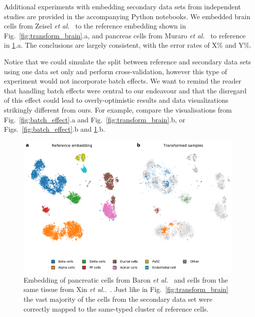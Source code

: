 \documentclass[runningheads]{llncs}
\newcommand{\etal}{\textit{et al.}}
\begin{document}
Additional experiments with embedding secondary data sets from independent
studies are provided in the accompanying Python notebooks. We embedded brain
cells from Zeisel \etal~\cite{zeisel2015} to the reference embedding shown in
Fig.~\ref{fig:transform_brain}.a, and pancreas cells from Muraro \etal~\cite{muraro2016} to reference
in \ref{fig:transform_pancreas}.a. The conclusions are largely consistent, with the error rates 
of X\% and Y\%. 

Notice that we could simulate the split between reference and secondary data
sets using one data set only and perform cross-validation, however this type of experiment
would not incorporate batch effects. We want to remind the reader that handling
batch effects were central to our endeavour and that the disregard of this effect
could lead to overly-optimistic results and data visualizations strikingly different from ours. For example,
compare the visualisations from Fig.~\ref{fig:batch_effect}.a and
Fig.~\ref{fig:transform_brain}.b, or Figs.~\ref{fig:batch_effect}.b and
\ref{fig:transform_pancreas}.b.




\begin{figure}[htb]
\includegraphics[width=\textwidth]{figures/transform_pancreas.pdf}
\caption{Embedding of pancreatic cells from Baron \etal~\cite{baron2016} and
cells from the same tissue from Xin \etal.~\cite{xin2016}. Just like in
Fig.~\ref{fig:transform_brain} the vast majority of the cells from the secondary
data set were correctly mapped to the same-typed cluster of reference
cells.}\label{fig:transform_pancreas}
\end{figure}
\end{document}
